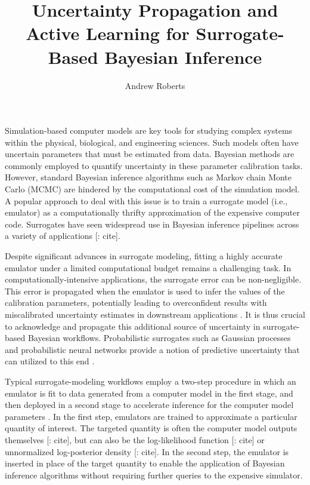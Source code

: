 \documentclass[12pt]{article}
\title{Uncertainty Propagation and Active Learning for Surrogate-Based Bayesian Inference}
\author{Andrew Roberts}
\begin{document}
\maketitle

Simulation-based computer models are key tools for studying complex systems within 
the physical, biological, and engineering sciences. 
Such models often have uncertain parameters that must be estimated from data. 
Bayesian methods are commonly employed
to quantify uncertainty in these parameter calibration tasks.
However, standard Bayesian inference algorithms such as Markov chain Monte Carlo (MCMC) 
are hindered by the computational cost of the simulation model.
A popular approach to deal with this issue is to train a surrogate model 
(i.e., emulator) as a computationally thrifty approximation of the expensive computer code.
Surrogates have seen widespread use in Bayesian inference pipelines across a variety 
of applications [\todo: cite]. 

Despite significant advances in surrogate modeling, fitting a 
highly accurate emulator under a limited computational budget remains a challenging task.
In computationally-intensive applications, the surrogate error can be non-negligible. 
This error is propagated when the emulator is used to infer the values of the calibration 
parameters, potentially leading to overconfident results with miscalibrated uncertainty 
estimates in downstream applications \citep{BurknerSurrogate}.
It is thus crucial to acknowledge and propagate this 
additional source of uncertainty in surrogate-based Bayesian workflows.
Probabilistic surrogates such as Gaussian processes \citep{gpML,gramacy2020surrogates} 
and probabilistic neural networks \citep{deepEnsembles,BayesOptNN} provide a notion of 
predictive uncertainty that can utilized to this end
 \citep{reviewPaper,BilionisBayesSurrogates,BurknerSurrogate,CES,FerEmulation}.
 
Typical surrogate-modeling workflows employ a two-step procedure
in which an emulator is fit to data generated from a computer model in the first stage, 
and then deployed in a second stage to accelerate inference for the computer 
model parameters \citep{modularization,BurknerTwoStep,BurknerSurrogate}. 
In the first step, emulators are trained to approximate a particular quantity of interest.
The targeted quantity is often the computer 
model outputs themselves [\todo: cite], but can also be the log-likelihood function [\todo: cite]
or unnormalized log-posterior density [\todo: cite]. In the second step, the emulator 
is inserted in place of the target quantity to enable the application of Bayesian inference  
algorithms without requiring further queries to the expensive simulator.
\end{document}
